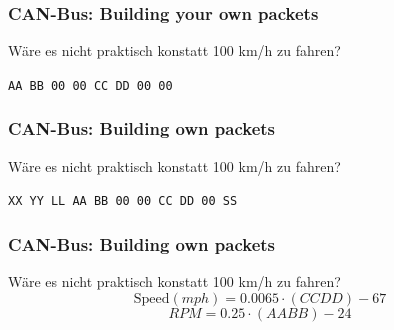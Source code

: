\documentclass[t]{beamer}
\begin{document}
\begin{frame}
	\frametitle{CAN-Bus: Building your own packets}
    Wäre es nicht praktisch konstatt 100 km/h zu fahren?
    \newline
    \newline
    \newline
    \newline
    {\Large \centerline{\texttt{AA BB 00 00 CC DD 00 00}}}
\end{frame}

\begin{frame}
	\frametitle{CAN-Bus: Building own packets}
    Wäre es nicht praktisch konstatt 100 km/h zu fahren?
    \newline
    \newline
    {\Large \centerline{\texttt{XX YY LL AA BB 00 00 CC DD 00 SS}}}
\end{frame}

\begin{frame}
	\frametitle{CAN-Bus: Building own packets}
    Wäre es nicht praktisch konstatt 100 km/h zu fahren?
    \newline
    \[\text{Speed} (mph) = 0.0065 \cdot (CC DD) - 67\]
    \[RPM = 0.25 \cdot (AA BB) - 24\]
\end{frame}
\end{document}
